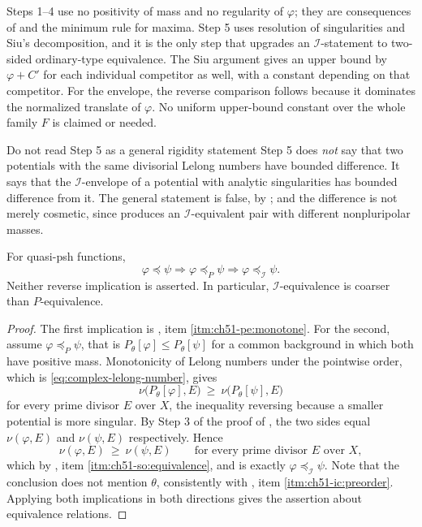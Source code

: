 \begin{remark}
\label{rem:ch51-i-projection-hypotheses}
Steps 1--4 use no positivity of mass and no regularity of $\varphi$;
they are consequences of  and the
minimum rule for maxima.  Step 5 uses resolution of singularities and
Siu's decomposition, and it is the only step that upgrades an
$\mathcal I$-statement to two-sided ordinary-type equivalence.
The Siu argument gives an upper bound by $\varphi+C'$ for each individual
competitor as well, with a constant depending on that competitor.
For the envelope, the reverse comparison follows because it dominates
the normalized translate of $\varphi$.  No uniform upper-bound constant
over the whole family $F$ is claimed or needed.
\end{remark}

\begin{warning}{Do not read Step 5 as a general rigidity statement}
\label{warn:ch51-step5}
Step 5 does \emph{not} say that two potentials with the same divisorial
Lelong numbers have bounded difference.  It says that the
$\mathcal I$-envelope of a potential with analytic singularities has
bounded difference from it.  The general statement is false, by
; and the difference is not merely
cosmetic, since  produces an
$\mathcal I$-equivalent pair with different nonpluripolar masses.
\end{warning}

\begin{corollary}\label{cor:complex-comparison-hierarchy}
For quasi-psh functions,
\[
 \varphi\preceq\psi
 \Longrightarrow
 \varphi\preceq_P\psi
 \Longrightarrow
 \varphi\preceq_{\mathcal I}\psi.
\tag{51.32}\label{eq:complex-comparison-hierarchy}
\]
Neither reverse implication is asserted.  In particular,
$\mathcal I$-equivalence is coarser than $P$-equivalence.
\end{corollary}

\begin{proof}
The first implication is , item
\cref{itm:ch51-pe:monotone}.  For the second, assume
$\varphi\preceq_P\psi$, that is
$P_\theta[\varphi]\leq P_\theta[\psi]$ for a common background in which
both have positive mass.  Monotonicity of Lelong numbers under the
pointwise order, which is \eqref{eq:complex-lelong-number}, gives
\[
 \nu\bigl(P_\theta[\varphi],E\bigr)
 \ \geq\
 \nu\bigl(P_\theta[\psi],E\bigr)
\]
for every prime divisor $E$ over $X$, the inequality reversing
because a smaller potential is more singular.  By Step 3 of the proof of
\Cref{thm:complex-i-projection}, the two sides equal
$\nu(\varphi,E)$ and $\nu(\psi,E)$ respectively.  Hence
\[
 \nu(\varphi,E)\ \geq\ \nu(\psi,E)
 \qquad\text{for every prime divisor }E\text{ over }X,
\]
which by , item
\cref{itm:ch51-so:equivalence}, and
 is exactly
$\varphi\preceq_{\mathcal I}\psi$.  Note that the conclusion does not
mention $\theta$, consistently with
, item \cref{itm:ch51-ic:preorder}.
Applying both implications in both directions gives the assertion about
equivalence relations.
\end{proof}

